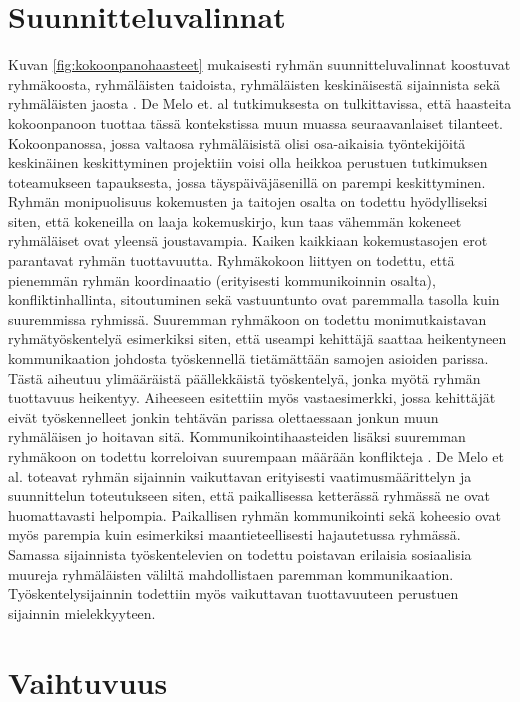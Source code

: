 \section{Suunnitteluvalinnat}

Kuvan \ref{fig:kokoonpanohaasteet} mukaisesti ryhmän suunnitteluvalinnat koostuvat ryhmäkoosta, ryhmäläisten taidoista, ryhmäläisten keskinäisestä sijainnista sekä ryhmäläisten jaosta \cite{DEOMELO2013412}. De Melo et. al \cite{DEOMELO2013412} tutkimuksesta on tulkittavissa, että haasteita kokoonpanoon tuottaa tässä kontekstissa muun muassa seuraavanlaiset tilanteet. Kokoonpanossa, jossa valtaosa ryhmäläisistä olisi osa-aikaisia työntekijöitä keskinäinen keskittyminen projektiin voisi olla heikkoa perustuen tutkimuksen toteamukseen tapauksesta, jossa täyspäiväjäsenillä on parempi keskittyminen. Ryhmän monipuolisuus kokemusten ja taitojen osalta on todettu hyödylliseksi siten, että kokeneilla on laaja kokemuskirjo, kun taas vähemmän kokeneet ryhmäläiset ovat yleensä joustavampia. Kaiken kaikkiaan kokemustasojen erot parantavat ryhmän tuottavuutta. Ryhmäkokoon liittyen on todettu, että pienemmän ryhmän koordinaatio (erityisesti kommunikoinnin osalta), konfliktinhallinta, sitoutuminen sekä vastuuntunto ovat paremmalla tasolla kuin suuremmissa ryhmissä. Suuremman ryhmäkoon on todettu monimutkaistavan ryhmätyöskentelyä esimerkiksi siten, että useampi kehittäjä saattaa heikentyneen kommunikaation johdosta työskennellä tietämättään samojen asioiden parissa. Tästä aiheutuu ylimääräistä päällekkäistä työskentelyä, jonka myötä ryhmän tuottavuus heikentyy. Aiheeseen esitettiin myös vastaesimerkki, jossa kehittäjät eivät työskennelleet jonkin tehtävän parissa olettaessaan jonkun muun ryhmäläisen jo hoitavan sitä. Kommunikointihaasteiden lisäksi suuremman ryhmäkoon on todettu korreloivan suurempaan määrään konflikteja \cite{DEOMELO2013412, SELLERISILVA201520}. De Melo et al. \cite{DEOMELO2013412} toteavat ryhmän sijainnin vaikuttavan erityisesti vaatimusmäärittelyn ja suunnittelun toteutukseen siten, että paikallisessa ketterässä ryhmässä ne ovat huomattavasti helpompia. Paikallisen ryhmän kommunikointi sekä koheesio ovat myös parempia kuin esimerkiksi maantieteellisesti hajautetussa ryhmässä. Samassa sijainnista työskentelevien on todettu poistavan erilaisia sosiaalisia muureja ryhmäläisten väliltä mahdollistaen paremman kommunikaation. Työskentelysijainnin todettiin myös vaikuttavan tuottavuuteen perustuen sijainnin mielekkyyteen.

\section{Vaihtuvuus}

